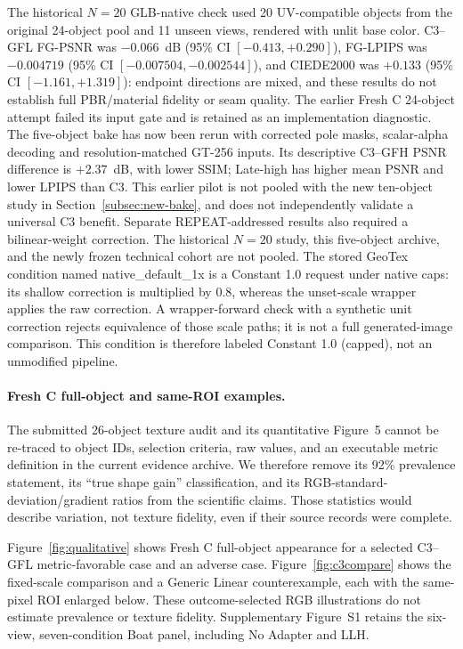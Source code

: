 \documentclass[times,twocolumn,final]{elsarticle}
\providecommand{\DIFadd}[1]{{\protect\color{blue} \sf #1}} %
\providecommand{\DIFaddend}{} %
\begin{document}
\DIFadd{The historical $N=20$ GLB-native check used 20 UV-compatible objects from the original 24-object pool and 11 unseen views, rendered with unlit base color. C3--GFL FG-PSNR was $-0.066$~dB (95\% CI $[-0.413,+0.290]$), FG-LPIPS was $-0.004719$ (95\% CI $[-0.007504,-0.002544]$), and CIEDE2000 was $+0.133$ (95\% CI $[-1.161,+1.319]$): endpoint directions are mixed, and these results do not establish full PBR/material fidelity or seam quality. The earlier Fresh C 24-object attempt failed its input gate and is retained as an implementation diagnostic. The five-object bake has now been rerun with corrected pole masks, scalar-alpha decoding and resolution-matched GT-256 inputs. Its descriptive C3--GFH PSNR difference is $+2.37$~dB, with lower SSIM; Late-high has higher mean PSNR and lower LPIPS than C3. This earlier pilot is not pooled with the new ten-object study in Section~\ref{subsec:new-bake}, and does not independently validate a universal C3 benefit. Separate REPEAT-addressed results also required a bilinear-weight correction. The historical $N=20$ study, this five-object archive, and the newly frozen technical cohort are not pooled. The stored GeoTex condition named native\_default\_1x is a Constant 1.0 request under native caps: its shallow correction is multiplied by 0.8, whereas the unset-scale wrapper applies the raw correction. A wrapper-forward check with a synthetic unit correction rejects equivalence of those scale paths; it is not a full generated-image comparison. This condition is therefore labeled Constant 1.0 (capped), not an unmodified pipeline.
}

\paragraph{Fresh C full-object and same-ROI examples.}
\label{subsec:visual}

\DIFadd{The submitted 26-object texture audit and its quantitative Figure~5 cannot be re-traced to object IDs, selection criteria, raw values, and an executable metric definition in the current evidence archive. We therefore remove its 92\% prevalence statement, its “true shape gain” classification, and its RGB-standard-deviation/gradient ratios from the scientific claims. Those statistics would describe variation, not texture fidelity, even if their source records were complete.
}

\DIFadd{Figure~\ref{fig:qualitative} shows Fresh C full-object appearance for a selected C3--GFL metric-favorable case and an adverse case. Figure~\ref{fig:c3compare} shows the fixed-scale comparison and a Generic Linear counterexample, each with the same-pixel ROI enlarged below. These outcome-selected RGB illustrations do not estimate prevalence or texture fidelity. Supplementary Figure~S1 retains the six-view, seven-condition Boat panel, including No Adapter and LLH}\DIFaddend .
\end{document}
